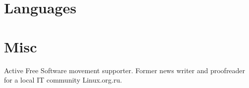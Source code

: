 \section{Languages}

\section{Misc}

Active Free Software movement supporter. Former news writer and proofreader for a local IT community
Linux.org.ru.
